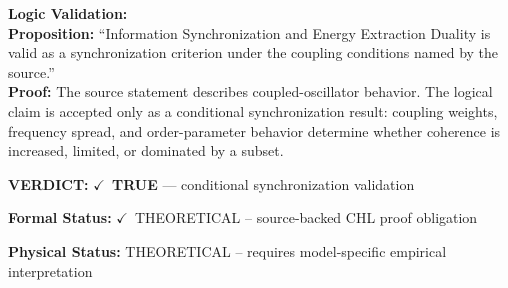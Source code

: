 \textbf{Logic Validation:}\\
\textbf{Proposition:} ``Information Synchronization and Energy Extraction Duality is valid as a synchronization
criterion under the coupling conditions named by the source.''\\
\textbf{Proof:} The source statement describes coupled-oscillator behavior. The logical claim is
accepted only as a conditional synchronization result: coupling weights, frequency
spread, and order-parameter behavior determine whether coherence is increased, limited,
or dominated by a subset.

\textbf{VERDICT:} \ensuremath{\checkmark}\ \textbf{TRUE} --- conditional synchronization validation

\textbf{Formal Status:} \ensuremath{\checkmark}\ THEORETICAL -- source-backed CHL proof obligation

\textbf{Physical Status:} THEORETICAL -- requires model-specific empirical interpretation
\par\vspace{0.45em}
\par
\ifTZPDarkEdition
{}
\fi
\endgroup
\endgroup
